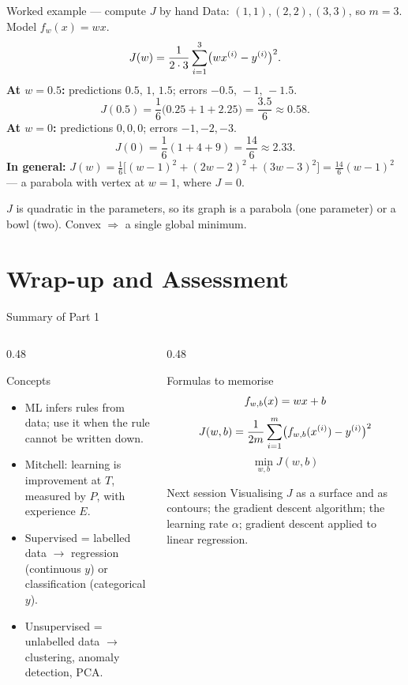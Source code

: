 \documentclass[aspectratio=169,10pt]{beamer}
\begin{document}
\begin{frame}{Worked example --- compute $J$ by hand}
  \footnotesize
  Data: $(1,1),(2,2),(3,3)$, so $m=3$. Model $f_w(x)=wx$.
  \[
    J(w)=\frac{1}{2\cdot 3}\sum_{i=1}^{3}\bigl(wx^{(i)}-y^{(i)}\bigr)^2 .
  \]
  \textbf{At $w=0.5$:} predictions $0.5,\,1,\,1.5$; errors $-0.5,\,-1,\,-1.5$.
  \[
    J(0.5)=\frac{1}{6}\bigl(0.25+1+2.25\bigr)=\frac{3.5}{6}\approx 0.58 .
  \]
  \textbf{At $w=0$:} predictions $0,0,0$; errors $-1,-2,-3$.
  \[
    J(0)=\frac{1}{6}(1+4+9)=\frac{14}{6}\approx 2.33 .
  \]
  \textbf{In general:} $J(w)=\frac{1}{6}\bigl[(w-1)^2+(2w-2)^2+(3w-3)^2\bigr]
        =\frac{14}{6}(w-1)^2$ --- a parabola with vertex at $w=1$, where $J=0$.
  \begin{keyidea}
    $J$ is quadratic in the parameters, so its graph is a parabola (one
    parameter) or a bowl (two). Convex $\Rightarrow$ a single global minimum.
  \end{keyidea}
\end{frame}

\section{Wrap-up and Assessment}

\begin{frame}{Summary of Part 1}
  \small
  \begin{columns}[T,onlytextwidth]
    \begin{column}{0.48\textwidth}
      \begin{block}{Concepts}
        \begin{itemize}
          \item ML infers rules from data; use it when the rule cannot be written down.
          \item Mitchell: learning is improvement at $T$, measured by $P$, with experience $E$.
          \item Supervised = labelled data $\to$ regression (continuous $y$) or
                classification (categorical $y$).
          \item Unsupervised = unlabelled data $\to$ clustering, anomaly detection, PCA.
        \end{itemize}
      \end{block}
    \end{column}
    \begin{column}{0.48\textwidth}
      \begin{block}{Formulas to memorise}
        \[ f_{w,b}(x)=wx+b \]
        \[ J(w,b)=\frac{1}{2m}\sum_{i=1}^{m}\bigl(f_{w,b}(x^{(i)})-y^{(i)}\bigr)^2 \]
        \[ \min_{w,b} J(w,b) \]
      \end{block}
      \begin{block}{Next session}
        \small Visualising $J$ as a surface and as contours; the gradient descent
        algorithm; the learning rate $\alpha$; gradient descent applied to
        linear regression.
      \end{block}
    \end{column}
  \end{columns}
\end{frame}
\end{document}
